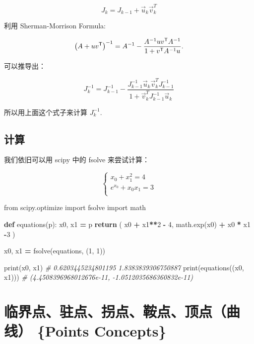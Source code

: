 \documentclass[
]{book}
\newenvironment{Shaded}{\begin{snugshade}}{\end{snugshade}}
\newcommand{\BuiltInTok}[1]{#1}
\newcommand{\CommentTok}[1]{\textcolor[rgb]{0.56,0.35,0.01}{\textit{#1}}}
\newcommand{\ControlFlowTok}[1]{\textcolor[rgb]{0.13,0.29,0.53}{\textbf{#1}}}
\newcommand{\DecValTok}[1]{\textcolor[rgb]{0.00,0.00,0.81}{#1}}
\newcommand{\ImportTok}[1]{#1}
\newcommand{\KeywordTok}[1]{\textcolor[rgb]{0.13,0.29,0.53}{\textbf{#1}}}
\newcommand{\NormalTok}[1]{#1}
\newcommand{\OperatorTok}[1]{\textcolor[rgb]{0.81,0.36,0.00}{\textbf{#1}}}
\begin{document}
\[
J_k= J_{k-1}+ \vec{u}_k\vec{v}_k^T
\]

利用 Sherman-Morrison Formula:

\[
{\displaystyle \left(A+uv^{\textsf {T}}\right)^{-1}=A^{-1}-{A^{-1}uv^{\textsf {T}}A^{-1} \over 1+v^{\textsf {T}}A^{-1}u}.}
\]

可以推导出：

\[
J_k^{-1} = J_{k-1}^{-1} - \frac{ J_{k-1}^{-1} \vec{u}_k \vec{v}_k^T J_{k-1}^{-1}  }{ 1 + \vec{v}_k^T J_{k-1}^{-1} \vec{u}_k}
\]

所以用上面这个式子来计算 \(J_k^{-1}\).

\hypertarget{ux8ba1ux7b97-6}{%
\section{计算}\label{ux8ba1ux7b97-6}}

我们依旧可以用 scipy 中的 fsolve 来尝试计算：

\[
\begin{cases}
 x_0 + x_1^2 = 4 \\
 e^{x_0} + {x_0}{x_1} = 3\\
\end{cases}
\]

\begin{Shaded}
\begin{Highlighting}[]
\ImportTok{from}\NormalTok{ scipy.optimize }\ImportTok{import}\NormalTok{ fsolve}
\ImportTok{import}\NormalTok{ math}

\KeywordTok{def}\NormalTok{ equations(p):}
\NormalTok{    x0, x1 }\OperatorTok{=}\NormalTok{ p}
    \ControlFlowTok{return}\NormalTok{ ( x0 }\OperatorTok{+}\NormalTok{ x1}\OperatorTok{**}\DecValTok{2} \OperatorTok{{-}} \DecValTok{4}\NormalTok{, math.exp(x0) }\OperatorTok{+}\NormalTok{ x0 }\OperatorTok{*}\NormalTok{ x1 }\OperatorTok{{-}}\DecValTok{3}\NormalTok{ )}

\NormalTok{x0, x1 }\OperatorTok{=}\NormalTok{ fsolve(equations, (}\DecValTok{1}\NormalTok{, }\DecValTok{1}\NormalTok{))}

\BuiltInTok{print}\NormalTok{(x0, x1)}
\CommentTok{\# 0.6203445234801195 1.8383839306750887}
\BuiltInTok{print}\NormalTok{(equations((x0, x1)))}
\CommentTok{\# (4.4508396968012676e{-}11, {-}1.0512035686360832e{-}11)}
\end{Highlighting}
\end{Shaded}

\hypertarget{ux4e34ux754cux70b9ux9a7bux70b9ux62d0ux70b9ux978dux70b9ux9876ux70b9ux66f2ux7ebf-points-concepts}{%
\chapter{临界点、驻点、拐点、鞍点、顶点（曲线） \{Points Concepts\}}\label{ux4e34ux754cux70b9ux9a7bux70b9ux62d0ux70b9ux978dux70b9ux9876ux70b9ux66f2ux7ebf-points-concepts}}
\end{document}
